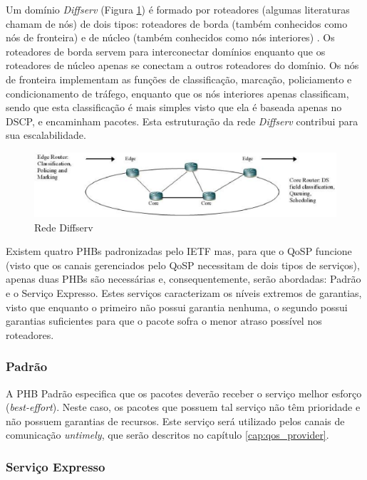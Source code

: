 	Um domí­nio \textit{Diffserv} (Figura \ref{fig:rede_diffserv}) é formado por roteadores (algumas literaturas chamam de nós) de dois tipos: roteadores de borda (também conhecidos como nós de fronteira) e de núcleo (também conhecidos como nós interiores) \cite{BBCDWW98}. Os roteadores de borda servem para interconectar domínios enquanto que os roteadores de núcleo apenas se conectam a outros roteadores do domínio. Os nós de fronteira implementam as funções de classificação, marcação, policiamento e condicionamento de tráfego, enquanto que os nós interiores apenas classificam, sendo que esta classificação é mais simples visto que ela é baseada apenas no DSCP, e encaminham pacotes. Esta estruturação da rede \textit{Diffserv} contribui para sua escalabilidade.
	
\begin{figure}
\centering
\includegraphics[scale=0.7]{rede_diffserv}
\caption{Rede Diffserv \cite{KFF03}}
\label{fig:rede_diffserv}
\end{figure}	
	
	Existem quatro PHBs padronizadas pelo IETF mas, para que o QoSP funcione (visto que os canais gerenciados pelo QoSP necessitam de dois tipos de serviços), apenas duas PHBs são necessárias e, consequentemente, serão abordadas: Padrão e o Serviço Expresso. Estes serviços caracterizam os níveis extremos de garantias, visto que enquanto o primeiro não possui garantia nenhuma, o segundo possui garantias suficientes para que o pacote sofra o menor atraso possível nos roteadores. 
	
\subsubsection{Padrão}

	A PHB Padrão especifica que os pacotes deverão receber o serviço melhor esforço (\textit{best-effort}). Neste caso, os pacotes que possuem tal serviço não têm prioridade e não possuem garantias de recursos. Este serviço será utilizado pelos canais de comunicação \textit{untimely}, que serão descritos no capítulo \ref{cap:qos_provider}.

\subsubsection{Serviço Expresso}	

